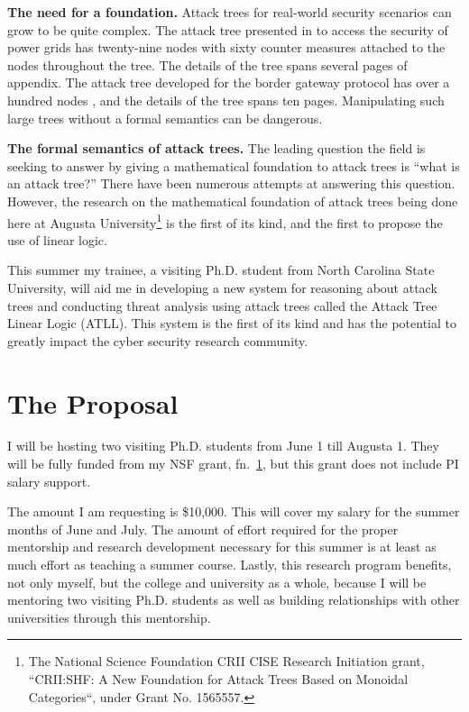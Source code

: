 \begin{full}
\textbf{The need for a foundation.}  Attack trees for real-world
security scenarios can grow to be quite complex.  The attack tree
presented in \cite{Ten:2007} to access the security of power grids has
twenty-nine nodes with sixty counter measures attached to the nodes
throughout the tree.  The details of the tree spans several pages of
appendix.  The attack tree developed for the border gateway protocol
has over a hundred nodes \cite{Convey:2003}, and the details of the
tree spans ten pages.  Manipulating such large trees without a formal
semantics can be dangerous.

\textbf{The formal semantics of attack trees.} The leading question
the field is seeking to answer by giving a mathematical foundation to
attack trees is ``what is an attack tree?''  There have been numerous
attempts at answering this question.  However, the research on the
mathematical foundation of attack trees being done here at Augusta
University\footnote{\label{grant}The National Science Foundation CRII CISE Research Initiation grant,
  ``CRII:SHF: A New Foundation for Attack Trees Based on Monoidal
  Categories``, under Grant No. 1565557.} is the first of its kind,
and the first to propose the use of linear logic.

This summer my trainee, a visiting Ph.D. student from North Carolina
State University, will aid me in developing a new system for reasoning
about attack trees and conducting threat analysis using attack trees
called the Attack Tree Linear Logic (ATLL).  This system is the first
of its kind and has the potential to greatly impact the cyber security
research community.


\section{The Proposal}
\label{sec:the_proposal}
I will be hosting two visiting Ph.D. students from June 1 till Augusta
1.  They will be fully funded from my NSF grant, fn.~\ref{grant}, but
this grant does not include PI salary support.

The amount I am requesting is \$10,000. This will cover my salary for
the summer months of June and July.  The amount of effort required for
the proper mentorship and research development necessary for this
summer is at least as much effort as teaching a summer course. Lastly,
this research program benefits, not only myself, but the college and
university as a whole, because I will be mentoring two visiting
Ph.D. students as well as building relationships with other
universities through this mentorship.


\end{full}
